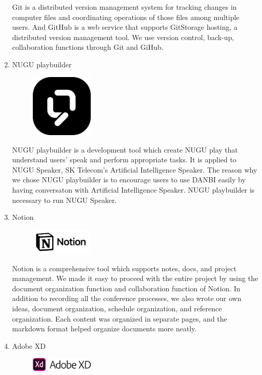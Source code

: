 \documentclass[conference]{IEEEtran}
\begin{document}
\begin{enumerate}
Git is a distributed version management system for tracking changes in computer files and coordinating operations of those files among multiple users. And GitHub is a web service that supports GitStorage hosting, a distributed version management tool. We use version control, back-up, collaboration functions through Git and GiHub.

\item NUGU playbuilder
\par \begin{figure}[h!]
\includegraphics[width=3cm]{image/NUGU playbuilder.png}
\centering
\end{figure}

NUGU playbuilder is a development tool which create NUGU play that understand users' speak and perform appropriate tasks. It is applied to NUGU Speaker, SK Telecom's Artificial Intelligence Speaker. The reason why we chose NUGU playbuilder is to encourage users to use DANBI easily by having conversaton with Artificial Intelligence Speaker. NUGU playbuilder is necessary to run NUGU Speaker.

\item Notion
\par \begin{figure}[h!]
\includegraphics[width=3cm]{image/Notion.JPG}
\centering
\end{figure}

Notion is a comprehensive tool which supports notes, docs, and project management. We made it easy to proceed with the entire project by using the document organization function and collaboration function of Notion. In addition to recording all the conference processes, we also wrote our own ideas, document organization, schedule organization, and reference organization. Each content was organized in separate pages, and the markdown format helped organize documents more neatly.

\item Adobe XD
\par \begin{figure}[h!]
\includegraphics[width=3cm]{image/Adobe XD.png}
\centering
\end{figure}


\end{enumerate}
\end{document}
